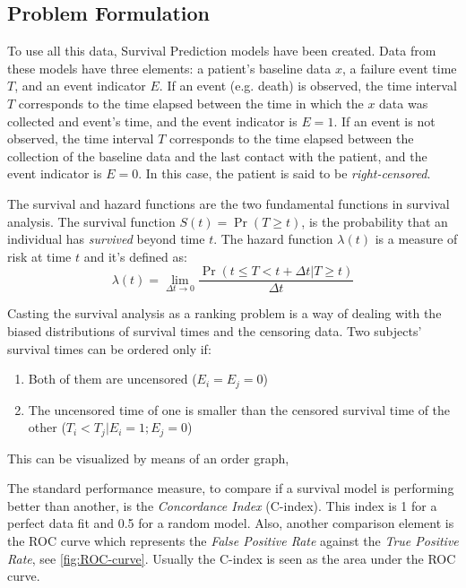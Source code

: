 \subsection{Problem Formulation}

To use all this data, Survival Prediction models have been created. Data from these models have
three elements: a patient's baseline data \( x \), a failure event time 
\( T \), and an event indicator \( E \). If an event (e.g. death) is observed, the time 
interval \( T \) corresponds to the time elapsed between the time in which the \( x \)
data was collected and event's time, and the event indicator is \( E = 1 \). If an
event is not observed, the time interval \( T \) corresponds to the time elapsed between
the collection of the baseline data and the last contact with the patient, and the 
event indicator is \( E = 0 \). In this case, the patient is said to be
\emph{right-censored}.
~\cite{DeepSurv}

The survival and hazard functions are the two fundamental functions in survival analysis. The
survival function \( S(t) = \Pr(T \ge t) \), is the probability that an individual has
\emph{survived} beyond time \( t \). The hazard function \( \lambda(t) \) is a measure of risk at 
time \( t \) and it's defined as:
~\cite{Cox}
\[
  \lambda(t) = \lim_{\Delta t \rightarrow 0}
  \frac{\Pr(t \le T < t + \Delta t | T \ge t)}{\Delta t}
\]

Casting the survival analysis as a ranking problem is a way of dealing with the biased
distributions of survival times and the censoring data. Two subjects' survival times can be 
ordered only if:
\begin{enumerate}
  \item Both of them are uncensored (\( E_i = E_j = 0\))
  \item The uncensored time of one is smaller than the censored survival time of the other
  (\( T_i < T_j | E_i = 1; E_j = 0 \))
\end{enumerate}
This can be visualized by means of an order graph,

The standard performance measure, to compare if a survival 
model is performing better than another, is the \emph{Concordance Index} (C-index). This 
index is 1 for a perfect data fit and 0.5 for a random model. Also, another comparison 
element is the ROC curve which represents the \emph{False Positive Rate} against the 
\emph{True Positive Rate}, see \autoref{fig:ROC-curve}. Usually the C-index is seen as 
the area under the ROC curve.
~\cites{ROC-precision-recall}{RankingCI}

